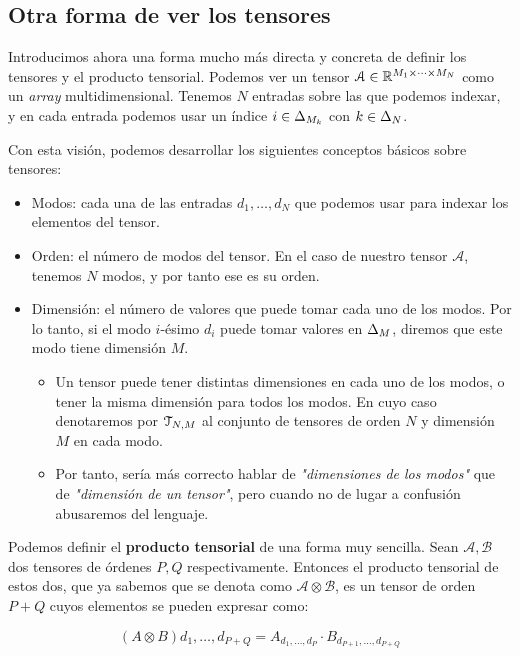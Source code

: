 \subsection{Otra forma de ver los tensores} \label{sec:otra_forma_tensores}

Introducimos ahora una forma mucho más directa y concreta de definir los tensores y el producto tensorial. Podemos ver un tensor $\mathcal{A} \in \mathbb{R}^{M_1 \times \cdots \times M_N}$ como un \textit{array} multidimensional. Tenemos $N$ entradas sobre las que podemos indexar, y en cada entrada podemos usar un índice $i \in \Delta_{M_k}$ con $k \in \Delta_{N}$.

Con esta visión, podemos desarrollar los siguientes conceptos básicos sobre tensores:

\begin{itemize}
	\item Modos: cada una de las entradas $d_1, \ldots, d_N$ que podemos usar para indexar los elementos del tensor.
	\item Orden: el número de modos del tensor. En el caso de nuestro tensor $\mathcal{A}$, tenemos $N$ modos, y por tanto ese es su orden.
	\item Dimensión: el número de valores que puede tomar cada uno de los modos. Por lo tanto, si el modo $i$-ésimo $d_i$ puede tomar valores en $\Delta_{M}$, diremos que este modo tiene dimensión $M$.
	      \begin{itemize}
		      \item Un tensor puede tener distintas dimensiones en cada uno de los modos, o tener la misma dimensión para todos los modos. En cuyo caso denotaremos por $\mathcal{T}_{N, M}$ al conjunto de tensores de orden $N$ y dimensión $M$ en cada modo.
		      \item Por tanto, sería más correcto hablar de \textit{"dimensiones de los modos"} que de \textit{"dimensión de un tensor"}, pero cuando no de lugar a confusión abusaremos del lenguaje.
	      \end{itemize}
\end{itemize}

Podemos definir el \textbf{producto tensorial} de una forma muy sencilla. Sean $\mathcal{A}, \mathcal{B}$ dos tensores de órdenes $P, Q$ respectivamente. Entonces el producto tensorial de estos dos, que ya sabemos que se denota como $\mathcal{A} \otimes \mathcal{B}$, es un tensor de orden $P + Q$ cuyos elementos se pueden expresar como:

$$(A \otimes B)d_1, \ldots, d_{P + Q} = A_{d_1, \ldots, d_P} \cdot B_{d_{P + 1}, \ldots, d_{P + Q}}$$

